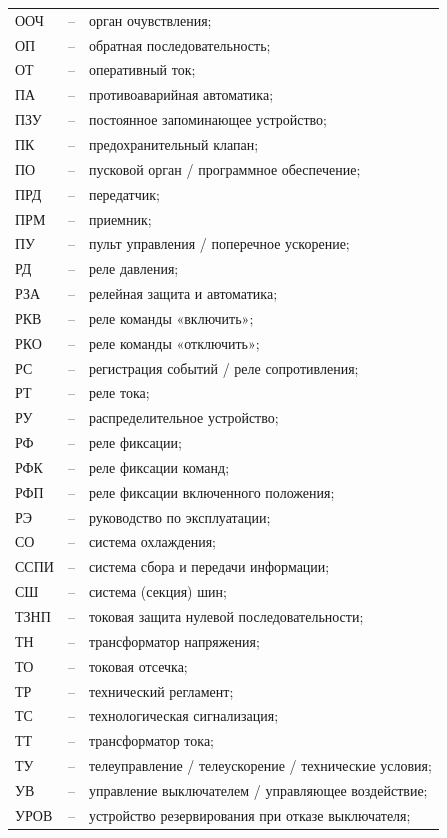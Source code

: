 \begin{longtable}{>{\raggedright\arraybackslash}m{2cm}>{\raggedright\arraybackslash}m{0.5cm}>{\raggedright\arraybackslash}m{20cm}}
ООЧ & -- & орган очувствления; \\
ОП & -- & обратная последовательность; \\
ОТ & -- & оперативный ток; \\
ПА & -- & противоаварийная автоматика; \\
ПЗУ & -- & постоянное запоминающее устройство; \\
ПК & -- & предохранительный клапан; \\
ПО & -- & пусковой орган / программное обеспечение; \\
ПРД & -- & передатчик; \\
ПРМ & -- & приемник; \\
ПУ & -- & пульт управления / поперечное ускорение; \\
РД & -- & реле давления; \\
РЗА & -- & релейная защита и автоматика; \\
РКВ & -- & реле команды «включить»; \\
РКО & -- & реле команды «отключить»; \\
РС & -- & регистрация событий / реле сопротивления; \\
РТ & -- & реле тока; \\
РУ & -- & распределительное устройство; \\
РФ & -- & реле фиксации; \\
РФК & -- & реле фиксации команд; \\
РФП & -- & реле фиксации включенного положения; \\
РЭ & -- & руководство по эксплуатации; \\
СО & -- & система охлаждения; \\
ССПИ & -- & система сбора и передачи информации; \\
СШ & -- & система (секция) шин; \\
ТЗНП & -- & токовая защита нулевой последовательности; \\
ТН & -- & трансформатор напряжения; \\
ТО & -- & токовая отсечка; \\
ТР & -- & технический регламент; \\
ТС & -- & технологическая сигнализация; \\
ТТ & -- & трансформатор тока; \\
ТУ & -- & телеуправление / телеускорение / технические условия; \\
УВ & -- & управление выключателем / управляющее воздействие; \\
УРОВ & -- & устройство резервирования при отказе выключателя; \\

\end{longtable}
